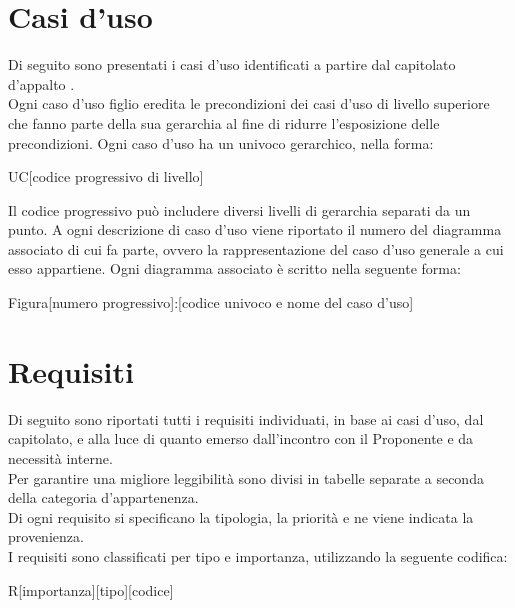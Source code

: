 \section{Casi d'uso} %
Di seguito sono presentati i casi d'uso identificati a partire dal capitolato d'appalto \Progetto. \\
Ogni caso d'uso figlio eredita le precondizioni dei casi d'uso di livello superiore che fanno parte della sua gerarchia al fine di ridurre l'esposizione delle precondizioni.
Ogni caso d'uso ha un  univoco gerarchico, nella forma:
\begin{center}
UC[codice progressivo di livello]
\end{center}
Il codice progressivo può includere diversi livelli di gerarchia separati da un punto.
A ogni descrizione di caso d'uso viene riportato il numero del diagramma associato di cui fa parte, ovvero la rappresentazione del caso d'uso generale a cui esso appartiene. 
Ogni diagramma associato è scritto nella seguente forma:
\begin{center}
Figura[numero progressivo]:[codice univoco e nome del caso d'uso]
\end{center}




\newpage


\newpage


\newpage
\section{Requisiti} %
Di seguito sono riportati tutti i requisiti individuati, in base ai casi d'uso, dal capitolato, e alla luce di quanto emerso dall'incontro con il Proponente e da necessità interne.\\
Per garantire una migliore leggibilità sono divisi in tabelle separate a seconda della categoria d'appartenenza.\\
Di ogni requisito si specificano la tipologia, la priorità e ne viene indicata la provenienza.\\
I requisiti sono classificati per tipo e importanza, utilizzando la seguente codifica:\\
\begin{center}
R[importanza][tipo][codice]
\end{center}

